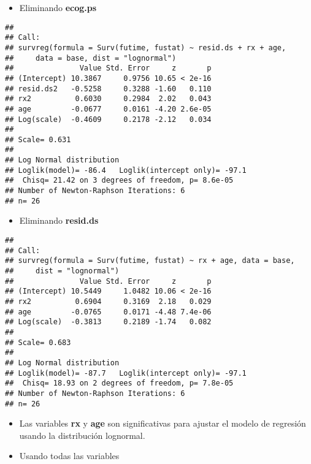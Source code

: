 \documentclass[
]{article}
\providecommand{\tightlist}{%
  \setlength{\itemsep}{0pt}\setlength{\parskip}{0pt}}
\begin{document}
\begin{itemize}
\tightlist
\item
  Eliminando \textbf{ecog.ps}
\end{itemize}

\begin{verbatim}
## 
## Call:
## survreg(formula = Surv(futime, fustat) ~ resid.ds + rx + age, 
##     data = base, dist = "lognormal")
##               Value Std. Error     z       p
## (Intercept) 10.3867     0.9756 10.65 < 2e-16
## resid.ds2   -0.5258     0.3288 -1.60   0.110
## rx2          0.6030     0.2984  2.02   0.043
## age         -0.0677     0.0161 -4.20 2.6e-05
## Log(scale)  -0.4609     0.2178 -2.12   0.034
## 
## Scale= 0.631 
## 
## Log Normal distribution
## Loglik(model)= -86.4   Loglik(intercept only)= -97.1
##  Chisq= 21.42 on 3 degrees of freedom, p= 8.6e-05 
## Number of Newton-Raphson Iterations: 6 
## n= 26
\end{verbatim}

\begin{itemize}
\tightlist
\item
  Eliminando \textbf{resid.ds}
\end{itemize}

\begin{verbatim}
## 
## Call:
## survreg(formula = Surv(futime, fustat) ~ rx + age, data = base, 
##     dist = "lognormal")
##               Value Std. Error     z       p
## (Intercept) 10.5449     1.0482 10.06 < 2e-16
## rx2          0.6904     0.3169  2.18   0.029
## age         -0.0765     0.0171 -4.48 7.4e-06
## Log(scale)  -0.3813     0.2189 -1.74   0.082
## 
## Scale= 0.683 
## 
## Log Normal distribution
## Loglik(model)= -87.7   Loglik(intercept only)= -97.1
##  Chisq= 18.93 on 2 degrees of freedom, p= 7.8e-05 
## Number of Newton-Raphson Iterations: 6 
## n= 26
\end{verbatim}

\begin{itemize}
\tightlist
\item
  Las variables \textbf{rx} y \textbf{age} son significativas para
  ajustar el modelo de regresión usando la distribución lognormal.
\end{itemize}


\begin{itemize}
\tightlist
\item
  Usando todas las variables
\end{itemize}
\end{document}
